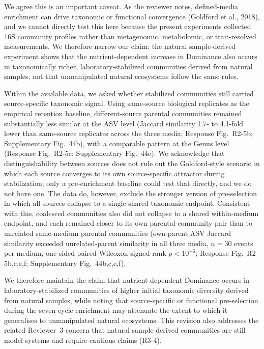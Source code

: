 \responselabel
We agree this is an important caveat. As the reviewer notes, defined-media enrichment can drive taxonomic or functional convergence (Goldford et al., 2018), and we cannot directly test this here because the present experiments collected 16S community profiles rather than metagenomic, metabolomic, or trait-resolved measurements. We therefore narrow our claim: the natural sample-derived experiment shows that the nutrient-dependent increase in Dominance also occurs in taxonomically richer, laboratory-stabilized communities derived from natural samples, not that unmanipulated natural ecosystems follow the same rules.

Within the available data, we asked whether stabilized communities still carried source-specific taxonomic signal. Using same-source biological replicates as the empirical retention baseline, different-source parental communities remained substantially less similar at the ASV level (Jaccard similarity 1.7- to 4.1-fold lower than same-source replicates across the three media; Response Fig.~R2-5b; Supplementary Fig.~44b), with a comparable pattern at the Genus level (Response Fig.~R2-5e; Supplementary Fig.~44e). We acknowledge that distinguishability between sources does not rule out the Goldford-style scenario in which each source converges to its own source-specific attractor during stabilization; only a pre-enrichment baseline could test that directly, and we do not have one. The data do, however, exclude the stronger version of pre-selection in which all sources collapse to a single shared taxonomic endpoint. Consistent with this, coalesced communities also did not collapse to a shared within-medium endpoint, and each remained closer to its own parental-community pair than to unrelated same-medium parental communities (own-parent ASV Jaccard similarity exceeded unrelated-parent similarity in all three media, $n=30$ events per medium, one-sided paired Wilcoxon signed-rank $p<10^{-6}$; Response Fig.~R2-5b,c,e,f; Supplementary Fig.~44b,c,e,f).

We therefore maintain the claim that nutrient-dependent Dominance occurs in laboratory-stabilized communities of higher initial taxonomic diversity derived from natural samples, while noting that source-specific or functional pre-selection during the seven-cycle enrichment may attenuate the extent to which it generalises to unmanipulated natural ecosystems. This revision also addresses the related Reviewer~3 concern that natural sample-derived communities are still model systems and require cautious claims (R3-4).


